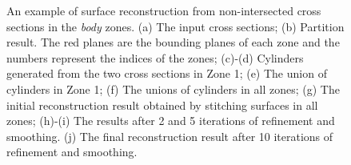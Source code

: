 \begin{figure} [htbp]
{\begin{minipage}[b]{0.22\textwidth}
    \end{minipage}}
  \caption{An example of surface reconstruction from non-intersected cross sections in the \textit{body} zones. (a) The input cross sections; (b) Partition result. The red planes are the bounding planes of each zone and the numbers represent the indices of the zones; (c)-(d) Cylinders generated from the two cross sections in Zone 1; (e) The union of cylinders in Zone 1; (f) The unions of cylinders in all zones; (g) The initial reconstruction result obtained by stitching surfaces in all zones; (h)-(i) The results after 2 and 5 iterations of refinement and
  smoothing. (j) The final reconstruction result after 10 iterations of refinement and smoothing.}
  \label{fig:cshape} %
\end{figure}

